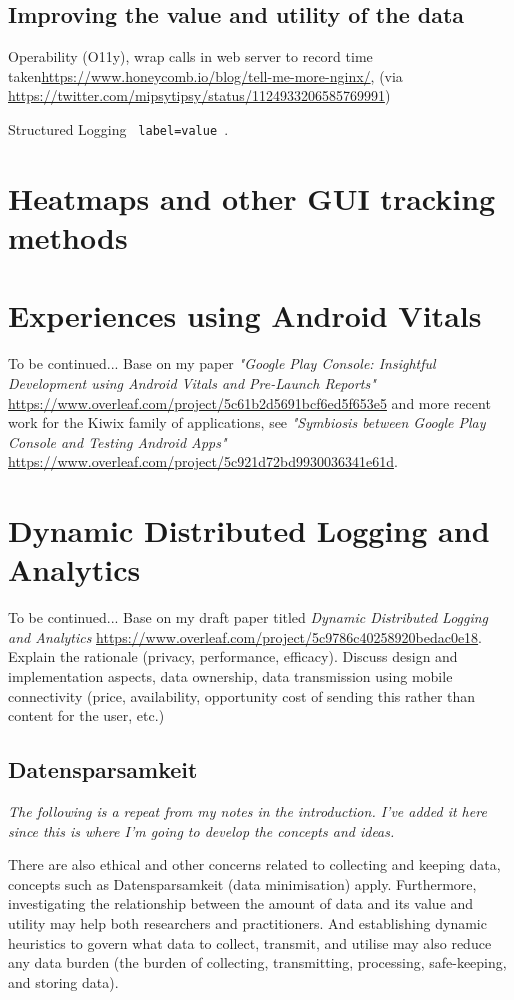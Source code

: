 \subsection{Improving the value and utility of the data}

Operability (O11y), wrap calls in web server to record time taken\url{https://www.honeycomb.io/blog/tell-me-more-nginx/}, (via \url{https://twitter.com/mipsytipsy/status/1124933206585769991})

Structured Logging \texttt{ label=value }.

\section{Heatmaps and other GUI tracking methods}


\section{Experiences using Android Vitals}
To be continued... Base on my paper \textit{"Google Play Console: Insightful Development using Android Vitals and Pre-Launch Reports"}  \url{https://www.overleaf.com/project/5c61b2d5691bcf6ed5f653e5} and more recent work for the Kiwix family of applications, see  \textit{"Symbiosis between Google Play Console and Testing Android Apps"} \url{https://www.overleaf.com/project/5c921d72bd9930036341e61d}.

\hypertarget{dynamiclogging}{\section{Dynamic Distributed Logging and Analytics}}
To be continued... Base on my draft paper titled \textit{Dynamic Distributed Logging and Analytics} \url{https://www.overleaf.com/project/5c9786c40258920bedac0e18}. Explain the rationale (privacy, performance, efficacy). Discuss design and implementation aspects, data ownership, data transmission using mobile connectivity (price, availability, opportunity cost of sending this rather than content for the user, etc.)

\subsection{Datensparsamkeit}
\textit{The following is a repeat from my notes in the introduction. I've added it here since this is where I'm going to develop the concepts and ideas.}

 There are also ethical and other concerns related to collecting and keeping data, concepts such as Datensparsamkeit\cite{fowler_datensparsamkeit_2013} (data minimisation) apply. Furthermore, investigating the relationship between the amount of data and its value and utility may help both researchers and practitioners. And establishing dynamic heuristics to govern what data to collect, transmit, and utilise may also reduce any data burden (the burden of collecting, transmitting, processing, safe-keeping, and storing data).
 
